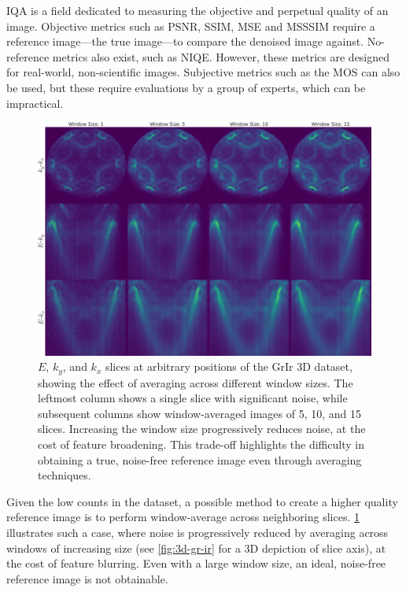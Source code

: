 \Gls{IQA} is a field dedicated to measuring the objective and perpetual quality of an image. Objective metrics such as \gls{PSNR}, \gls{SSIM}, \gls{MSE} and \gls{MSSSIM} require a reference image---the true image---to compare the denoised image against. No-reference metrics also exist, such as \gls{NIQE}. However, these metrics are designed for real-world, non-scientific images. Subjective metrics such as the \gls{MOS} can also be used, but these require evaluations by a group of experts, which can be impractical.

\begin{figure}
    \centering
    \includegraphics[width=1\linewidth]{images/slices.pdf}
    \caption{$E$, $k_y$, and $k_x$ slices at arbitrary positions of the \gls{GrIr} 3D dataset, showing the effect of averaging across different window sizes. The leftmost column shows a single slice with significant noise, while subsequent columns show window-averaged images of 5, 10, and 15 slices. Increasing the window size progressively reduces noise, at the cost of feature broadening. This trade-off highlights the difficulty in obtaining a true, noise-free reference image even through averaging techniques.}
    \label{fig:slices}
\end{figure}

Given the low counts in the dataset, a possible method to create a higher quality reference image is to perform window-average across neighboring slices. \cref{fig:slices} illustrates such a case, where noise is progressively reduced by averaging across windows of increasing size (see \cref{fig:3d-gr-ir} for a 3D depiction of slice axis), at the cost of feature blurring. Even with a large window size, an ideal, noise-free reference image is not obtainable.

